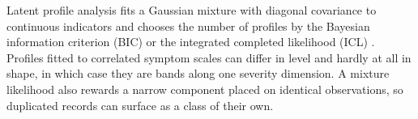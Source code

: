 Latent profile analysis fits a Gaussian mixture with diagonal covariance to continuous indicators and chooses the number of profiles by the Bayesian information criterion (BIC) or the integrated completed likelihood (ICL) \parencite{scrucca2016,biernacki2000}. Profiles fitted to correlated symptom scales can differ in level and hardly at all in shape, in which case they are bands along one severity dimension. A mixture likelihood also rewards a narrow component placed on identical observations, so duplicated records can surface as a class of their own.
